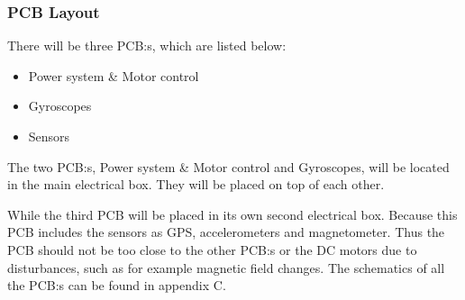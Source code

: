 \subsubsection{PCB Layout}
There will be three PCB:s, which are listed below: 

\begin{itemize}
	\item 	Power system & Motor control 
	\item	Gyroscopes 
	\item 	Sensors
\end{itemize}

The two PCB:s, Power system & Motor control  and Gyroscopes, will be located in the main electrical box. They will be placed on top of each other. %



While the third PCB will be placed in its own second electrical box. Because this PCB includes the sensors as GPS, accelerometers and magnetometer. Thus the PCB should not be too close to the other PCB:s or the DC motors due to disturbances, such as for example magnetic field changes. The schematics of all the PCB:s can be found in appendix C.
\raggedbottom